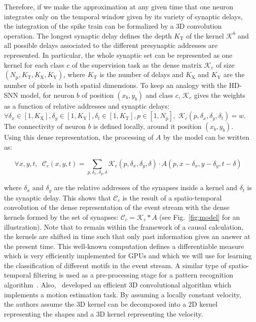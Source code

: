 \documentclass[default]{sn-jnl}%
\theoremstyle{thmstyleone}%
\theoremstyle{thmstyletwo}%
\theoremstyle{thmstylethree}%
\newcommand{\seeFig}[1]{see Fig.~\ref{fig:#1}}%
\newcommand{\postsynaddr}{b} %
\newcommand{\Npol}{N_\text{p}} %
\newcommand{\synapticweight}{w} %
\newcommand{\synapticdelay}{\delta} %
\newcommand{\timev}{t} %
\newcommand{\polev}{p} %
\newcommand{\kernel}{\mathcal{K}} %
\newcommand{\Kx}{K_\text{X}}
\newcommand{\Ky}{K_\text{Y}}
\newcommand{\Ktime}{K_\text{T}}
\newcommand{\class}{c} %
\begin{document}
Therefore, if we make the approximation at any given time that one neuron integrates only on the temporal window given by its variety of synaptic delays, the integration of the spike train can be formalized by a 3D convolution operation. The longest synaptic delay defines the depth $\Ktime$ of the kernel $\kernel^\postsynaddr$ and all possible delays associated to the different presynaptic addresses are represented. In particular, the whole synaptic set can be represented as one kernel for each class $\class$ of the supervision task as the dense matrix $\kernel_\class$ of size $(\Npol, \Ktime, \Kx, \Ky)$, where  $\Ktime$ is the number of delays and $\Kx$ and $\Ky$ are the number of pixels in both spatial dimensions. To keep an analogy with the HD-SNN model, for neuron $\postsynaddr$ of position $(x_\postsynaddr, y_\postsynaddr)$ and class $\class$, $\kernel_\class$ gives the weights as a function of relative addresses and synaptic delays: $\forall {\delta_x \in [1, \Kx], \delta_y \in [1, \Ky], \delta_\timev \in [1, \Ktime], \polev \in [1, \Npol]}, \; \kernel_\class(\polev, \delta_x, \delta_y, \synapticdelay_\timev) = \synapticweight$. The connectivity of neuron $\postsynaddr$ is defined locally, around it position $(x_\postsynaddr, y_\postsynaddr)$. Using this dense representation, the processing of $A$ by the model can be written as: %
%
\begin{linenomath*}
\begin{equation}\label{eq:kernel_b}
\forall x, y, \timev, \; \;
\mathcal{C}_\class(x, y, \timev)
= \sum_{p, \delta_x, \delta_y, \synapticdelay} \kernel_\class(p, \delta_x, \delta_y, \synapticdelay) \cdot A(p, x - \delta_x, y - \delta_y, \timev-\synapticdelay)
\end{equation}
\end{linenomath*}
%
where $\delta_x$ and $\delta_y$ are the relative addresses of the synapses inside a kernel and $\delta_\timev$ is the synaptic delay. 
This shows that $\mathcal{C}_\class$ is the result of a spatio-temporal convolution of the dense representation of the event stream with the dense kernels formed by the set of synapses:  $\mathcal{C}_\class = \kernel_\class \ast A$ (\seeFig{model} for an illustration). Note that to remain within the framework of a causal calculation, the kernels are shifted in time such that only past information gives an answer at the present time. This well-known computation defines a differentiable measure which is very efficiently implemented for GPUs and which we will use for learning the classification of different motifs in the event stream. A similar type of spatio-temporal filtering is used as a pre-processing stage for a pattern recognition algorithm~\citep{ghosh_spatiotemporal_2019}. Also,~\citet{sekikawa_constant_2018} developed an efficient 3D convolutional algorithm which implements a motion estimation task. By assuming a locally constant velocity, the authors assume the 3D kernel can be decomposed into a 2D kernel representing the shapes and a 3D kernel representing the velocity. 
\end{document}
